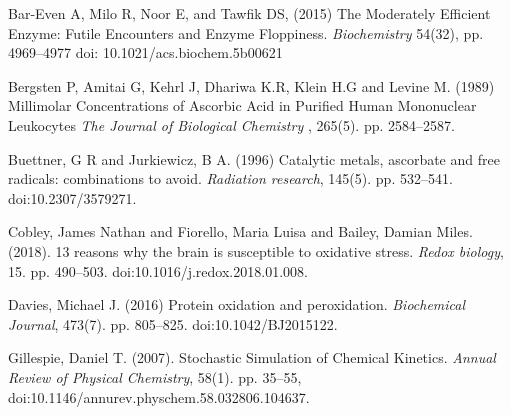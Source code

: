 \documentclass[preprint,12pt,authoryear]{elsarticle}
\begin{document}
\begin{thebibliography}{00}



%

Bar-Even A, Milo R, Noor E, and Tawfik DS,
(2015)
The Moderately Efficient Enzyme: Futile Encounters and Enzyme Floppiness.
{\em Biochemistry} 54(32), 
pp. 4969--4977
doi: 10.1021/acs.biochem.5b00621 


Bergsten P, Amitai G, Kehrl J, Dhariwa K.R, Klein H.G and Levine M.
(1989)
Millimolar Concentrations of Ascorbic Acid in Purified Human Mononuclear Leukocytes
{ \em The Journal of Biological Chemistry },  265(5).
pp. 2584--2587.


Buettner, G R and Jurkiewicz, B A.
(1996)
Catalytic metals, ascorbate and free radicals: combinations to avoid.
{\em Radiation research}, 145(5).
pp. 532--541.
doi:10.2307/3579271.







Cobley, James Nathan and Fiorello, Maria Luisa and Bailey, Damian Miles.
(2018).
13 reasons why the brain is susceptible to oxidative stress.
{ \em Redox biology},  15.
pp. 490--503.
doi:10.1016/j.redox.2018.01.008.


Davies, Michael J.
(2016)
Protein oxidation and peroxidation.
{ \em Biochemical Journal}, 473(7).
pp. {805--825}.
doi:10.1042/BJ2015122.





Gillespie, Daniel T.
(2007).
Stochastic Simulation of Chemical Kinetics.
{ \em Annual Review of Physical Chemistry},  58(1).
pp.  {35--55},
doi:10.1146/annurev.physchem.58.032806.104637.



\end{thebibliography}
\end{document}
